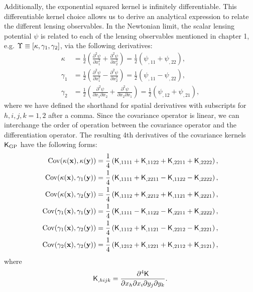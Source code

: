 Additionally, the exponential squared kernel is infinitely differentiable. This
differentiable kernel choice allows us to derive an analytical expression to
relate the different lensing observables.  
In the Newtonian limit, the scalar lensing potential $\psi$ is related to 
each of the lensing observables mentioned in chapter 1, e.g. 
$\Upsilon \equiv [\kappa, \gamma_1, \gamma_2]$, via the following derivatives:
\begin{align}
\kappa &= \frac{1}{2}\left(\frac{\partial^2 \psi}{\partial x_1^2} +
\frac{\partial^2 \psi}{\partial x_2^2 }\right) 
= \frac{1}{2} (\psi_{,11} + \psi_{,22}),\\ 
\gamma_1 
&=\frac{1}{2}\left(\frac{\partial^2 \psi}{\partial x_1^2} - 
\frac{\partial^2 \psi}{\partial x_2^2}\right) 
= \frac{1}{2} (\psi_{,11} - \psi_{,22}), \\
\gamma_2 
&=\frac{1}{2}\left(\frac{\partial^2 \psi}{\partial x_1 \partial
x_2} + \frac{\partial^2 \psi}{\partial x_2 \partial x_1}\right)
= \frac{1}{2} (\psi_{,12} + \psi_{,21}), 
\end{align}
where we have defined the shorthand for spatial derivatives with
subscripts for $h,i,j,k = 1, 2$ after a comma.
Since the covariance operator is linear, we can interchange the order of
operation between the covariance operator and the differentiation operator. 
The resulting 4th derivatives of the covariance
kernels $\mathsf{K}_{\rm GP}$ have the following forms: 
\begin{align}
	\label{eq:kernel_derivatives1}
	\mathrm{Cov} (\kappa(\mathbf{x}), \kappa(\mathbf{y}))
&= \frac{1}{4}\left(
\mathsf{K}_{,1111} + \mathsf{K}_{,1122} + \mathsf{K}_{,2211} + \mathsf{K}_{,2222}
\right), \\
\mathrm{Cov}(\kappa(\mathbf{x}), \gamma_1(\mathbf{y})) &= \frac{1}{4}\left(
\mathsf{K}_{,1111} + \mathsf{K}_{,2211} - \mathsf{K}_{,1122} - \mathsf{K}_{,2222}
\right), \\
\mathrm{Cov}(\kappa(\mathbf{x}), \gamma_2(\mathbf{y})) &= \frac{1}{4}\left(
\mathsf{K}_{,1112} + \mathsf{K}_{,2212} + \mathsf{K}_{,1121} + \mathsf{K}_{,2221}
\right),\\
\mathrm{Cov}(\gamma_1(\mathbf{x}), \gamma_1(\mathbf{y})) &= \frac{1}{4}\left(
\mathsf{K}_{,1111} - \mathsf{K}_{,1122} - \mathsf{K}_{,2211} + \mathsf{K}_{,2222}
\right), \\
\mathrm{Cov}(\gamma_1(\mathbf{x}), \gamma_2(\mathbf{y})) &= \frac{1}{4}\left(
\mathsf{K}_{,1112} + \mathsf{K}_{,1121} - \mathsf{K}_{,2212} - \mathsf{K}_{,2221}
\right), \\
\mathrm{Cov}(\gamma_2(\mathbf{x}), \gamma_2(\mathbf{y})) &= \frac{1}{4}\left(
\mathsf{K}_{,1212} + \mathsf{K}_{,1221} + \mathsf{K}_{,2112} + \mathsf{K}_{,2121}
\right),
	\label{eq:kernel_derivatives2}
\end{align}
where
\begin{equation}
	\mathsf{K}_{,hijk} = \frac{\partial^4 \mathsf{K}}{\partial x_h \partial x_i
	\partial y_j \partial y_k}.
\end{equation}

